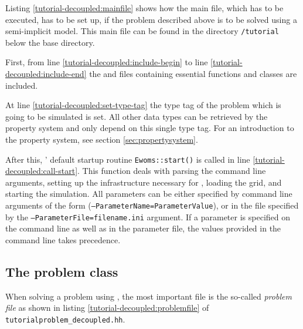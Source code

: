 Listing \ref{tutorial-decoupled:mainfile} shows how the main file, which has to be executed, has to be set up, if the problem described above is to be solved using a semi-implicit model. This main file can be found in the directory \texttt{/tutorial} below the \eWoms base directory.

\begin{lst}\label{tutorial-decoupled:mainfile} \mbox{}

\end{lst}

First, from line \ref{tutorial-decoupled:include-begin} to line
\ref{tutorial-decoupled:include-end} the \Dune and \eWoms files containing
essential functions and classes are included.

At line \ref{tutorial-decoupled:set-type-tag} the type tag of the
problem which is going to be simulated is set. All other data types
can be retrieved by the \eWoms property system and only depend on this
single type tag. For an introduction to the
property system, see section \ref{sec:propertysystem}.

After this, \eWoms' default startup routine \texttt{Ewoms::start()} is
called in line \ref{tutorial-decoupled:call-start}. This function deals
with parsing the command line arguments, 
setting up the infrastructure necessary for \Dune, loading the grid, and
starting the simulation. All parameters can
be either specified by command line arguments of the form
(\texttt{--ParameterName=ParameterValue}), or in the file specified by the
\texttt{--ParameterFile=filename.ini} argument. If a parameter is
specified on the command line as well as in the parameter file, the
values provided in the command line takes
precedence.

\subsection{The problem class} \label{decoupled_problem}

When solving a problem using \eWoms, the most important file is the
so-called \textit{problem file} as shown in listing
\ref{tutorial-decoupled:problemfile} of
\texttt{tutorialproblem\_decoupled.hh}.

\begin{lst}\label{tutorial-decoupled:problemfile} \mbox{}

\end{lst}

